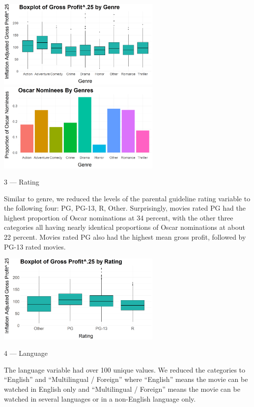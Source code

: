 \documentclass[10pt]{article}
\begin{document}
\begin{center}
\includegraphics[width=8cm]{_assets/_eda/genre_iagp_bp.png}
\hspace{1cm}
\includegraphics[width=8cm]{_assets/_eda/on_by_genre.png}

\end{center}

3 --- Rating

Similar to genre, we reduced the levels of the parental guideline rating variable to the following four: PG, PG-13, R, Other. Surprisingly, movies rated PG had the highest proportion of Oscar nominations at 34 percent, with the other three categories all having nearly identical proportions of Oscar nominations at about 22 percent. Movies rated PG also had the highest mean gross profit, followed by PG-13 rated movies.

\begin{center}
\includegraphics[width=8cm]{_assets/_eda/rating_iagp_bp.png}

\end{center}

4 --- Language

The language variable had over 100 unique values. We reduced the categories to “English” and “Multilingual / Foreign” where “English” means the movie can be watched in English only and “Multilingual / Foreign” means the movie can be watched in several languages or in a non-English language only.
\end{document}
